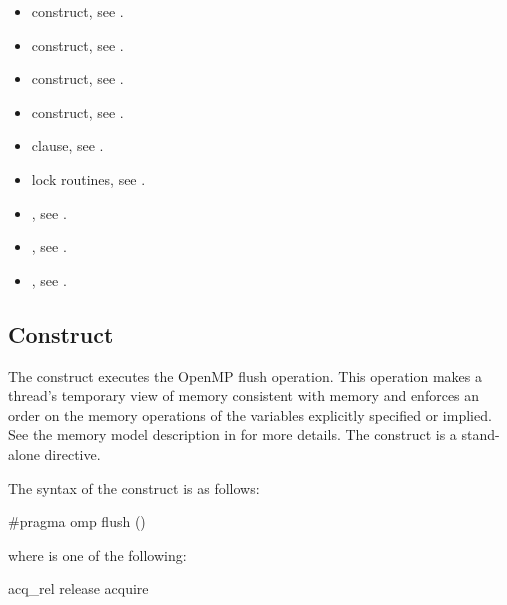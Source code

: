 \crossreferences
\begin{itemize}
\item {} construct, see 
. 

\item {} construct, see 
.

\item {} construct, see 
.

\item {} construct, see 
.

\item {} clause, see 
.

\item lock routines, see 
.

\item {}, see
.

\item {}, see
.

\item {}, see
.

\end{itemize}









\subsection{ Construct}
\label{subsec:flush Construct}
\summary
The  construct executes the OpenMP flush operation. This operation makes a 
thread’s temporary view of memory consistent with memory and enforces an order on 
the memory operations of the variables explicitly specified or implied. See the memory 
model description in  for more details. The  construct is a 
stand-alone directive.

\syntax
\begin{ccppspecific}
The syntax of the  construct is as follows:

\begin{boxedcode}
\#pragma omp flush  \plc{[}()\plc{] new-line}
\end{boxedcode}
\begin{samepage}
where  is one of the following:

\begin{indentedcodelist}
acq\_rel
release
acquire
\end{indentedcodelist}
\end{samepage}
\end{ccppspecific}

